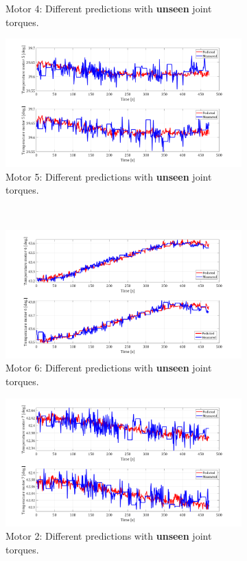 \documentclass{ifacconf}
\begin{document}
\begin{figure}[t!]
\begin{subfigure}[t]{\columnwidth}
	\caption{Motor 4: Different predictions with \textbf{unseen} joint torques.}
\end{subfigure}
	\begin{subfigure}[t]{\columnwidth}
	\includegraphics[height=2.in]{./pictures/applications/J5o.png}
	\caption{Motor 5: Different predictions with \textbf{unseen} joint torques.}
\end{subfigure}%
~ 
\begin{subfigure}[t]{\columnwidth}
	\includegraphics[height=2.in]{./pictures/applications/J6o.png}
	\caption{Motor 6: Different predictions with \textbf{unseen} joint torques.}
\end{subfigure}
\begin{subfigure}[t]{\columnwidth}
	\includegraphics[height=2.in]{./pictures/applications/J7o.png}
	\caption{Motor 2: Different predictions with \textbf{unseen} joint torques.}
\end{subfigure}
~
\begin{subfigure}[t]{\columnwidth}

\end{subfigure}
\end{figure}
\end{document}
